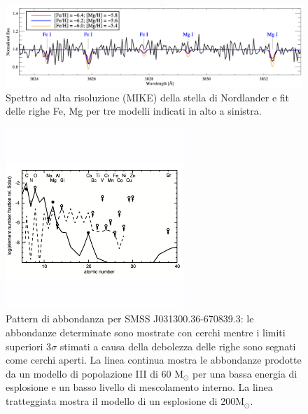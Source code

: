 \documentclass[12pt]{article}
\begin{document}
\begin{figure}[htp!]
\center
  \includegraphics[width=1 \textwidth]{nordlander}
  \caption{Spettro ad alta risoluzione (MIKE) della stella di Nordlander e fit delle righe Fe, Mg per tre modelli indicati in alto a sinistra. }
  \label{nordlander}
 \end{figure}



\begin{figure}[!tbp]
  \centering
     \includegraphics[width=0.6\textwidth]{keller2}
    \caption{Pattern di abbondanza per SMSS J031300.36-670839.3: le abbondanze determinate sono mostrate con cerchi mentre i limiti superiori 3$\sigma$ stimati a causa della debolezza delle righe sono segnati come cerchi aperti. La linea continua mostra le abbondanze prodotte da un modello di popolazione III di 60 M$_{\odot}$ per una bassa energia di esplosione e un basso livello di mescolamento interno. La linea tratteggiata mostra il modello di un esplosione di 200M$_{\odot}$.}
    \label{keller2}
  \end{figure}
\end{document}

